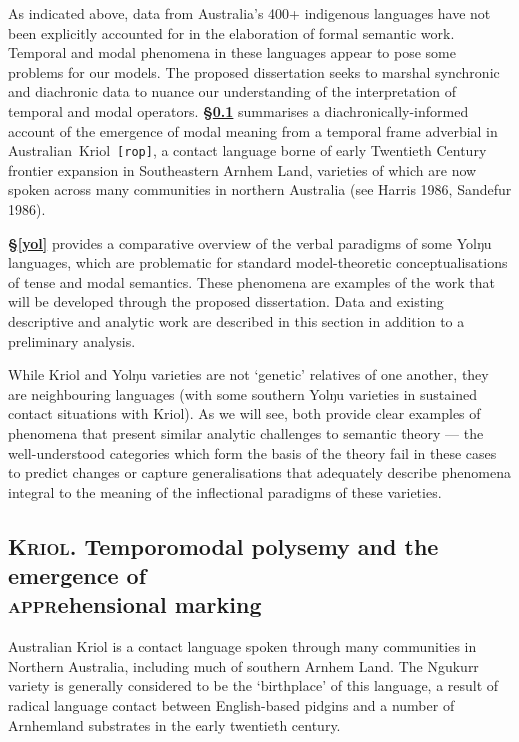 \documentclass[12pt]{article}
\newcommand{\mcom}[1]
 {\marginpar{\raggedleft\raggedright\hspace{0pt}\linespread{0.9}\footnotesize{#1}}}
\newcommand{\hk}[1]
 {\marginpar{\color{purple}\raggedleft\raggedright\hspace{0pt}\linespread{0.8}\footnotesize{#1}}}
\renewcommand{\mcom}[1]{}
\renewcommand{\hk}[1]{}
\begin{document}
As indicated above, data from Australia's 400+ indigenous languages have not been explicitly accounted for in the elaboration of formal semantic work. Temporal and modal phenomena in these languages appear to pose some problems for our models. The proposed dissertation seeks to marshal synchronic and diachronic data to nuance our understanding of the interpretation of temporal and modal operators. \textbf{§\ref{rop}} summarises a diachronically-informed account of the emergence of modal meaning from a temporal frame adverbial in Australian~Kriol~\texttt{[rop]}, a contact language borne of early Twentieth Century frontier expansion in Southeastern Arnhem Land, varieties of which are now spoken across many communities in northern Australia (see Harris 1986, Sandefur 1986).

\textbf{§\ref{yol}} provides a comparative overview of the verbal paradigms of some Yolŋu languages, which are problematic for standard model-theoretic conceptualisations of tense and modal semantics. These phenomena are examples of the work that will be developed through the proposed dissertation.\mcom{`examples' --- too mysterious?} Data and existing descriptive and analytic work are described in this section in addition to a preliminary analysis.

While Kriol and Yolŋu varieties are not `genetic' relatives of one another, they are neighbouring languages (with some southern Yolŋu varieties in sustained contact situations with Kriol). As we will see, both provide clear examples of phenomena that present similar analytic challenges to semantic theory --- the well-understood categories which form the basis of the theory fail in these cases to predict changes or capture generalisations that adequately describe phenomena integral to the meaning of the inflectional paradigms of these varieties.\hk{reword final sentence?}
\hk{\textbf{General comment 1:} okay so really what I'm missing at this point is detail. What specifically are you looking at? Is there a concise way to explain what challenges the data pose (even just a couple of examples) so your readers can get a sense of what you're going to show and do? }
\subsection{\textsc{\textbf{Kriol}}. Temporomodal polysemy and the emergence of \\\textsc{appr}ehensional marking}\label{rop}

Australian Kriol is a contact language spoken through many communities in Northern Australia, including much of southern Arnhem Land. The Ngukurr variety is generally considered to be the `birthplace' of this language, a result of radical language contact between English-based pidgins and a number of Arnhemland substrates in the early twentieth century.
\end{document}

